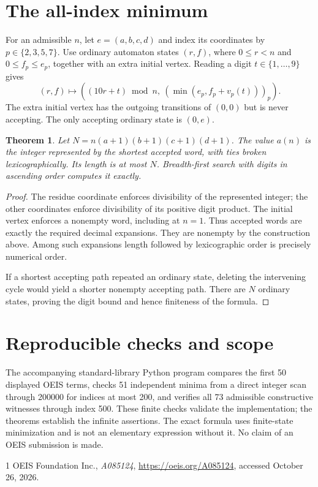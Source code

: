 \documentclass[10pt]{article}
\newtheorem{theorem}{Theorem}
\begin{document}
\section{The all-index minimum}
For an admissible $n$, let $e=(a,b,c,d)$ and index its coordinates by $p\in\{2,3,5,7\}$. Use ordinary automaton states $(r,f)$, where $0\le r<n$ and $0\le f_p\le e_p$, together with an extra initial vertex. Reading a digit $t\in\{1,\ldots,9\}$ gives
\[
 (r,f)\longmapsto\left((10r+t)\bmod n,\ (\min(e_p,f_p+v_p(t)))_p\right).
\]
The extra initial vertex has the outgoing transitions of $(0,0)$ but is never accepting. The only accepting ordinary state is $(0,e)$.
\begin{theorem}
Let $N=n(a+1)(b+1)(c+1)(d+1)$. The value $a(n)$ is the integer represented by the shortest accepted word, with ties broken lexicographically. Its length is at most $N$. Breadth-first search with digits in ascending order computes it exactly.
\end{theorem}
\begin{proof}
The residue coordinate enforces divisibility of the represented integer; the other coordinates enforce divisibility of its positive digit product. The initial vertex enforces a nonempty word, including at $n=1$. Thus accepted words are exactly the required decimal expansions. They are nonempty by the construction above. Among such expansions length followed by lexicographic order is precisely numerical order.

If a shortest accepting path repeated an ordinary state, deleting the intervening cycle would yield a shorter nonempty accepting path. There are $N$ ordinary states, proving the digit bound and hence finiteness of the formula.
\end{proof}
\section{Reproducible checks and scope}
The accompanying standard-library Python program compares the first 50 displayed OEIS terms, checks 51 independent minima from a direct integer scan through 200000 for indices at most 200, and verifies all 73 admissible constructive witnesses through index 500. These finite checks validate the implementation; the theorems establish the infinite assertions. The exact formula uses finite-state minimization and is not an elementary expression without it. No claim of an OEIS submission is made.
\begin{thebibliography}{1}
 OEIS Foundation Inc., \emph{A085124}, \url{https://oeis.org/A085124}, accessed October 26, 2026.
\end{thebibliography}
\end{document}
